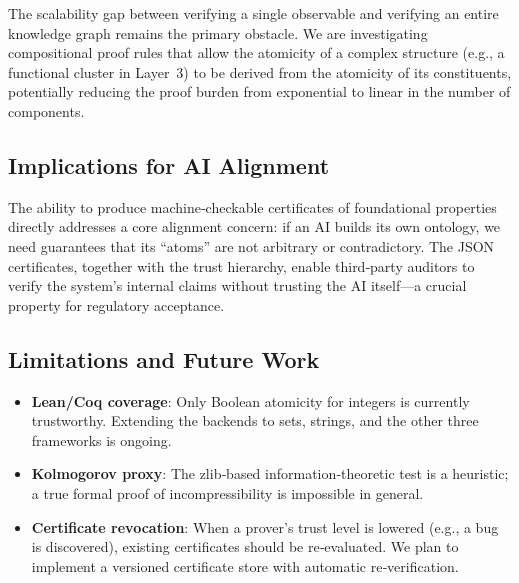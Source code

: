 The scalability gap between verifying a single observable and verifying an
entire knowledge graph remains the primary obstacle.  We are investigating
compositional proof rules that allow the atomicity of a complex structure
(e.g., a functional cluster in Layer~3) to be derived from the atomicity
of its constituents, potentially reducing the proof burden from exponential
to linear in the number of components.

\subsection{Implications for AI Alignment}

The ability to produce machine‑checkable certificates of foundational
properties directly addresses a core alignment concern: if an AI builds its
own ontology, we need guarantees that its ``atoms'' are not arbitrary or
contradictory.  The JSON certificates, together with the trust hierarchy,
enable third‑party auditors to verify the system's internal claims without
trusting the AI itself—a crucial property for regulatory acceptance.

\subsection{Limitations and Future Work}

\begin{itemize}
    \item \textbf{Lean/Coq coverage}: Only Boolean atomicity for integers
          is currently trustworthy.  Extending the backends to sets,
          strings, and the other three frameworks is ongoing.
    \item \textbf{Kolmogorov proxy}: The zlib‑based information‑theoretic
          test is a heuristic; a true formal proof of incompressibility is
          impossible in general.
    \item \textbf{Certificate revocation}: When a prover's trust level is
          lowered (e.g., a bug is discovered), existing certificates should
          be re‑evaluated.  We plan to implement a versioned certificate
          store with automatic re‑verification.
\end{itemize}